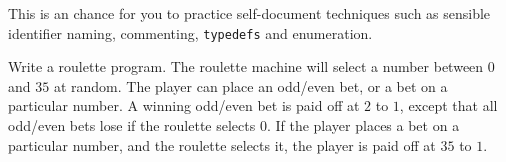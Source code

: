This is an chance for you to practice self-document techniques such as
sensible identifier naming, commenting, \verb^typedefs^ and enumeration.
\begin{exercise}
Write a roulette program. The roulette machine will select
a number between $0$ and $35$ at random. The player
can place an odd/even bet, or a bet on a particular number.
A winning odd/even bet is paid off at $2$ to $1$, except
that all odd/even bets lose if the roulette selects $0$.
If the player places a bet on a particular number, and the
roulette selects it, the player is paid off at $35$ to $1$.
\end{exercise}
